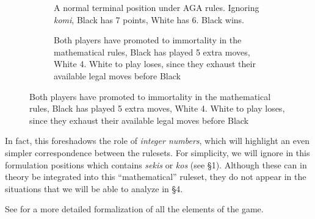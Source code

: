 \documentclass[../math194_paper.tex]{subfiles}
\begin{document}
\begin{figure}[H]
\begin{subfigure}[b]{0.45\linewidth}
\centering
\begin{psgoboard*}[5]
    
\end{psgoboard*}
\caption{A normal terminal position under AGA rules. Ignoring 
\textit{komi}, Black has 7 points, White has 6. Black wins.}
\end{subfigure}
\quad
\begin{subfigure}[b]{0.45\linewidth}
\centering
\begin{psgoboard*}[5]
    
    
\end{psgoboard*}
\caption{Both players have promoted to immortality in the mathematical rules,
Black has played 5 extra moves, White 4. White to play loses, since they exhaust their available legal moves before Black}
\end{subfigure}
\end{figure}

In fact, this foreshadows the role of \textit{integer numbers}, which will highlight 
an even simpler correspondence between the rulesets.
For simplicity, we will ignore in this formulation positions which contains \textit{sekis} 
or \textit{kos} (see \S 1). Although these can in theory be integrated into this 
``mathematical'' ruleset, they do not appear in the situations that we will be able to 
analyze in \S 4. 

See \cite[Appendix B]{berlekamp1994mathematical} for a more detailed formalization
of all the elements of the game.
\end{document}

